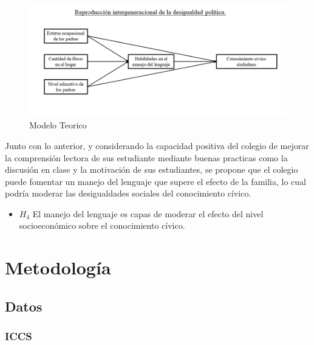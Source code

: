 \documentclass[12pt,twoside]{templates/facsothesis}
\providecommand{\tightlist}{%
  \setlength{\itemsep}{0pt}\setlength{\parskip}{0pt}}
\begin{document}
\begin{figure}[!ht]

{\centering \includegraphics[width=0.95\linewidth,]{images/modelo} 

}

\caption{Modelo Teorico}\label{fig:unnamed-chunk-4}
\end{figure}

Junto con lo anterior, y considerando la capacidad positiva del colegio de mejorar la comprensión lectora de sus estudiante mediante buenas practicas como la discusión en clase y la motivación de sus estudiantes, se propone que el colegio puede fomentar un manejo del lenguaje que supere el efecto de la familia, lo cual podría moderar las desigualdades sociales del conocimiento cívico.

\begin{itemize}
\tightlist
\item
  \(H_4\) El manejo del lenguaje es capas de moderar el efecto del nivel socioeconómico sobre el conocimiento cívico.
\end{itemize}

\hypertarget{metodologuxeda}{%
\chapter{Metodología}\label{metodologuxeda}}

\hypertarget{datos}{%
\section{Datos}\label{datos}}

\hypertarget{iccs}{%
\subsection{ICCS}\label{iccs}}
\end{document}
